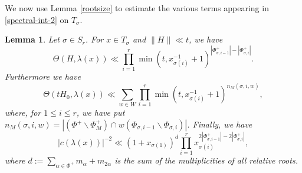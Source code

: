 \documentclass[12pt]{amsart}
\newtheorem{lemma}[theorem]{Lemma}
\theoremstyle{remark}
\newcommand{\be}{\begin{equation}}
\newcommand{\ee}{\end{equation}}
\begin{document}
We now use Lemma \ref{rootsize} to estimate the various terms appearing in \eqref{spectral-int-2} on $T_\sigma$. 


\begin{lemma}\label{lemma:barycentric-bounds}
Let $\sigma\in S_r$. For $x\in T_\sigma$ and $\|H\|\ll t$, we have
\be
\label{thetabd}
\Theta(H, \lambda(x)) \ll \prod_{i = 1}^r \min( t, x_{\sigma(i)}^{-1} +1)^{|\Phi_{\sigma, i-1}^+| - |\Phi_{\sigma, i}^+| }.
\ee
Furthermore we have
\be
\label{thetaH0bd}
\Theta(tH_0, \lambda(x)) \ll \sum_{w \in W} \prod_{i = 1}^r \min( t, x_{\sigma(i)}^{-1} +1)^{n_M(\sigma, i, w) },
\ee
where, for $1\le i\le r$, we have put $n_M(\sigma, i, w) = |(\Phi^+ \smallsetminus \Phi^+_M) \cap w(\Phi_{\sigma, i-1} \smallsetminus \Phi_{\sigma, i})|$.
Finally, we have
\be
\label{cnear}
|c(\lambda(x))|^{-2}\ll (1+x_{\sigma(1)})^{d} \prod_{i = 1}^r x_{\sigma(i)}^{ 2|\Phi_{\sigma, i-1}^+| - 2|\Phi_{\sigma, i}^+| },
\ee
where $d := \sum_{\alpha \in \Phi^+} m_\alpha + m_{2 \alpha}$ is the sum of the multiplicities of all relative roots.

\end{lemma}
\end{document}
